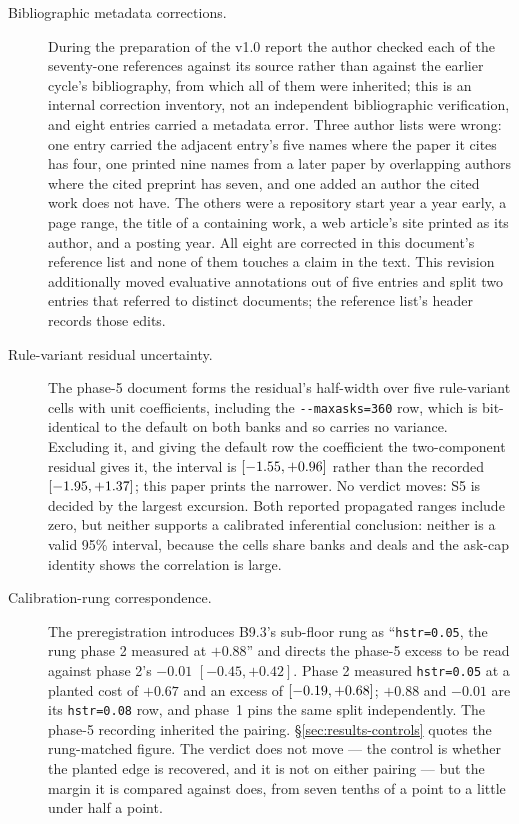 \begin{description}
\item[Bibliographic metadata corrections.] During the preparation of the v1.0 report the author
  checked each of the seventy-one references against its source rather than against the earlier
  cycle's bibliography, from which all of them were inherited; this is an internal correction
  inventory, not an independent bibliographic verification, and eight entries carried a metadata
  error. Three author lists
  were wrong: one entry carried the adjacent entry's five names where the paper it cites has four,
  one printed nine names from a later paper by overlapping authors where the cited preprint has
  seven, and one added an author the cited work does not have. The others were a repository start
  year a year early, a page range, the title of a containing work, a web article's site printed as
  its author, and a posting year. All eight are corrected in this document's reference list and none
  of them touches a claim in the text. This revision additionally moved evaluative annotations out
  of five entries and split two entries that referred to distinct documents; the reference list's
  header records those edits.

\item[Rule-variant residual uncertainty.] The phase-5 document forms the residual's half-width
  over five rule-variant cells with unit coefficients, including the \texttt{-{}-maxasks=360} row,
  which is bit-identical to the default on both banks and so carries no variance. Excluding it, and
  giving the default row the coefficient the two-component residual gives it, the interval is
  $[-1.55, +0.96]$ rather than the recorded
  $[-1.95, +1.37]$; this paper prints the
  narrower. No verdict moves: S5 is decided by the largest excursion. Both reported propagated
  ranges include zero, but neither supports a calibrated inferential conclusion: neither is a valid
  95\% interval, because the cells share banks and deals and the ask-cap identity shows the
  correlation is large.

\item[Calibration-rung correspondence.] The
  preregistration introduces B9.3's sub-floor rung as ``\texttt{hstr=0.05}, the rung phase 2 measured
  at $+0.88$'' and directs the phase-5 excess to be read against phase 2's $-0.01$
  $[-0.45, +0.42]$. Phase 2 measured \texttt{hstr=0.05} at a planted cost of $+0.67$ and an excess of
  \vsevenSubFloorExcess{} $[-0.19, +0.68]$; $+0.88$ and $-0.01$
  are its \texttt{hstr=0.08} row, and phase~1 pins the same split independently. The phase-5
  recording inherited the pairing. \S\ref{sec:results-controls} quotes the rung-matched figure. The
  verdict does not move --- the control is whether the planted edge is recovered, and it is not on
  either pairing --- but the margin it is compared against does, from seven tenths of a point to a
  little under half a point.


\end{description}
